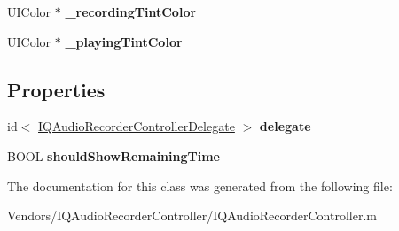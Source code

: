 \begin{DoxyCompactItemize}
\item 
\hypertarget{interface_i_q_internal_audio_recorder_controller_acbd709d69d23302708c1566ee61d85ed}{}U\+I\+Color $\ast$ {\bfseries \+\_\+recording\+Tint\+Color}\label{interface_i_q_internal_audio_recorder_controller_acbd709d69d23302708c1566ee61d85ed}

\item 
\hypertarget{interface_i_q_internal_audio_recorder_controller_af16ecca38a1a306451a3cfedcc3ffc10}{}U\+I\+Color $\ast$ {\bfseries \+\_\+playing\+Tint\+Color}\label{interface_i_q_internal_audio_recorder_controller_af16ecca38a1a306451a3cfedcc3ffc10}

\end{DoxyCompactItemize}
\subsection*{Properties}
\begin{DoxyCompactItemize}
\item 
\hypertarget{interface_i_q_internal_audio_recorder_controller_a6c426aa19b19c87c8364f1bd4f4e8b7c}{}id$<$ \hyperlink{protocol_i_q_audio_recorder_controller_delegate-p}{I\+Q\+Audio\+Recorder\+Controller\+Delegate} $>$ {\bfseries delegate}\label{interface_i_q_internal_audio_recorder_controller_a6c426aa19b19c87c8364f1bd4f4e8b7c}

\item 
\hypertarget{interface_i_q_internal_audio_recorder_controller_a81f7d26d9aa3c077137e83e42dbb8cbb}{}B\+O\+O\+L {\bfseries should\+Show\+Remaining\+Time}\label{interface_i_q_internal_audio_recorder_controller_a81f7d26d9aa3c077137e83e42dbb8cbb}

\end{DoxyCompactItemize}


The documentation for this class was generated from the following file\+:\begin{DoxyCompactItemize}
\item 
Vendors/\+I\+Q\+Audio\+Recorder\+Controller/I\+Q\+Audio\+Recorder\+Controller.\+m\end{DoxyCompactItemize}
